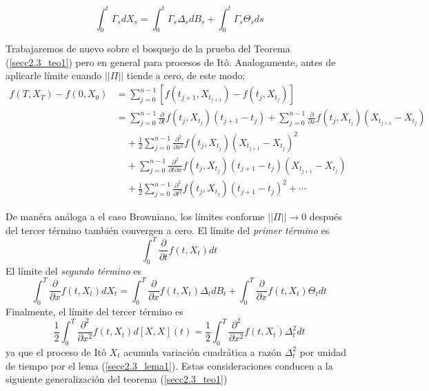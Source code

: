\documentclass[11pt,notitlepage]{article}
\begin{document}
\begin{equation}\label{secc2.3_IntegralRespectoIto}
    \int_{0}^{t}\Gamma_{s}dX_{s}=\int_{0}^{t}\Gamma_{s}\Delta_{s}dB_{s}+\int_{0}^{t}\Gamma_{s}\Theta_{s}ds
\end{equation}

Trabajaremos de nuevo sobre el bosquejo de la prueba del Teorema (\ref{secc2.3_teo1}) pero en general para procesos de Itô. Analogamente, antes de aplicarle límite cuando $||\Pi||$ tiende a cero, de este modo:
\begin{align*}
    f(T,X_{T})-f(0,X_{0})&= \sum_{j=0}^{n-1}\left [ f(t_{j+1},X_{t_{j+1}})-f(t_{j},X_{t_{j}}) \right ]\\
    &=\sum_{j=0}^{n-1}\frac{\partial}{\partial t}f(t_{j},X_{t_{j}})(t_{j+1}-t_{j})+\sum_{j=0}^{n-1}\frac{\partial}{\partial x}f(t_{j},X_{t_{j}})(X_{t_{j+1}}-X_{t_{j}})\\
    & \ \ \ \ \ +\frac{1}{2} \sum_{j=0}^{n-1} \frac{\partial^2}{\partial x^2}f(t_{j},X_{t_{j}})(X_{t_{j+1}}-X_{t_{j}})^2\\
    & \ \ \ \ \ +  \sum_{j=0}^{n-1} \frac{\partial^2}{\partial t \partial x}f(t_{j},X_{t_{j}})(t_{j+1}-t_{j})(X_{t_{j+1}}-X_{t_{j}})\\
    & \ \ \ \ \ +\frac{1}{2} \sum_{j=0}^{n-1} \frac{\partial^2}{\partial t^2}f(t_{j},X_{t_{j}})(t_{j+1}-t_{j})^2+\cdots
\end{align*}

De manéra análoga a el caso Browniano, los límites conforme $||\Pi|| \rightarrow 0$ después del tercer término también convergen a cero. El límite del \textit{primer término} es
\begin{equation*}
     \int_{0}^{T}\frac{\partial}{\partial t}f(t,X_{t})dt
\end{equation*}
El límite del \textit{segundo término} es
\begin{equation*}
    \int_{0}^{T}\frac{\partial}{\partial x}f(t,X_{t})dX_{t}=\int_{0}^{T}\frac{\partial}{\partial x}f(t,X_{t})\Delta_{t}dB_{t}+\int_{0}^{T}\frac{\partial}{\partial x}f(t,X_{t})\Theta_{t}dt
\end{equation*}
Finalmente, el límite del tercer término es
\begin{equation*}
   \frac{1}{2} \int_{0}^{T}\frac{\partial^2}{\partial x^2}f(t,X_{t})d[X,X](t)=\frac{1}{2} \int_{0}^{T}\frac{\partial^2}{\partial x^2}f(t,X_{t})\Delta_{t}^{2}dt
\end{equation*}
ya que el proceso de Itô $X_{t}$ acumula variación cuadrática a razón $\Delta_{t}^{2}$ por unidad de tiempo por el lema (\ref{secc2.3_lema1}). Estas consideraciones conducen a la siguiente generalización del teorema (\ref{secc2.3_teo1})
\end{document}
